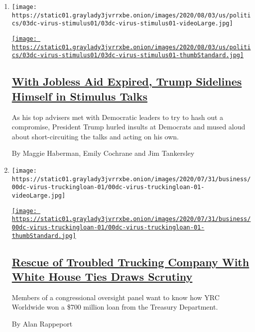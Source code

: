 \begin{enumerate}
\def\labelenumi{\arabic{enumi}.}
\item
  \texttt{[image: https://static01.graylady3jvrrxbe.onion/images/2020/08/03/us/politics/03dc-virus-stimulus01/03dc-virus-stimulus01-videoLarge.jpg]}

  \href{/2020/08/03/us/politics/congress-jobless-aid-talks-trump.html}{\texttt{[image: https://static01.graylady3jvrrxbe.onion/images/2020/08/03/us/politics/03dc-virus-stimulus01/03dc-virus-stimulus01-thumbStandard.jpg]}}

  \hypertarget{with-jobless-aid-expired-trump-sidelines-himself-in-stimulus-talks}{%
  \subsection{\texorpdfstring{\href{/2020/08/03/us/politics/congress-jobless-aid-talks-trump.html}{With
  Jobless Aid Expired, Trump Sidelines Himself in Stimulus
  Talks}}{With Jobless Aid Expired, Trump Sidelines Himself in Stimulus Talks}}\label{with-jobless-aid-expired-trump-sidelines-himself-in-stimulus-talks}}

  As his top advisers met with Democratic leaders to try to hash out a
  compromise, President Trump hurled insults at Democrats and mused
  aloud about short-circuiting the talks and acting on his own.

  By Maggie Haberman, Emily Cochrane and Jim Tankersley
\item
  \texttt{[image: https://static01.graylady3jvrrxbe.onion/images/2020/07/31/business/00dc-virus-truckingloan-01/00dc-virus-truckingloan-01-videoLarge.jpg]}

  \href{/2020/08/03/us/politics/yrc-coronavirus-relief-funds.html}{\texttt{[image: https://static01.graylady3jvrrxbe.onion/images/2020/07/31/business/00dc-virus-truckingloan-01/00dc-virus-truckingloan-01-thumbStandard.jpg]}}

  \hypertarget{rescue-of-troubled-trucking-company-with-white-house-ties-draws-scrutiny}{%
  \subsection{\texorpdfstring{\href{/2020/08/03/us/politics/yrc-coronavirus-relief-funds.html}{Rescue
  of Troubled Trucking Company With White House Ties Draws
  Scrutiny}}{Rescue of Troubled Trucking Company With White House Ties Draws Scrutiny}}\label{rescue-of-troubled-trucking-company-with-white-house-ties-draws-scrutiny}}

  Members of a congressional oversight panel want to know how YRC
  Worldwide won a \$700 million loan from the Treasury Department.

  By Alan Rappeport
\end{enumerate}

